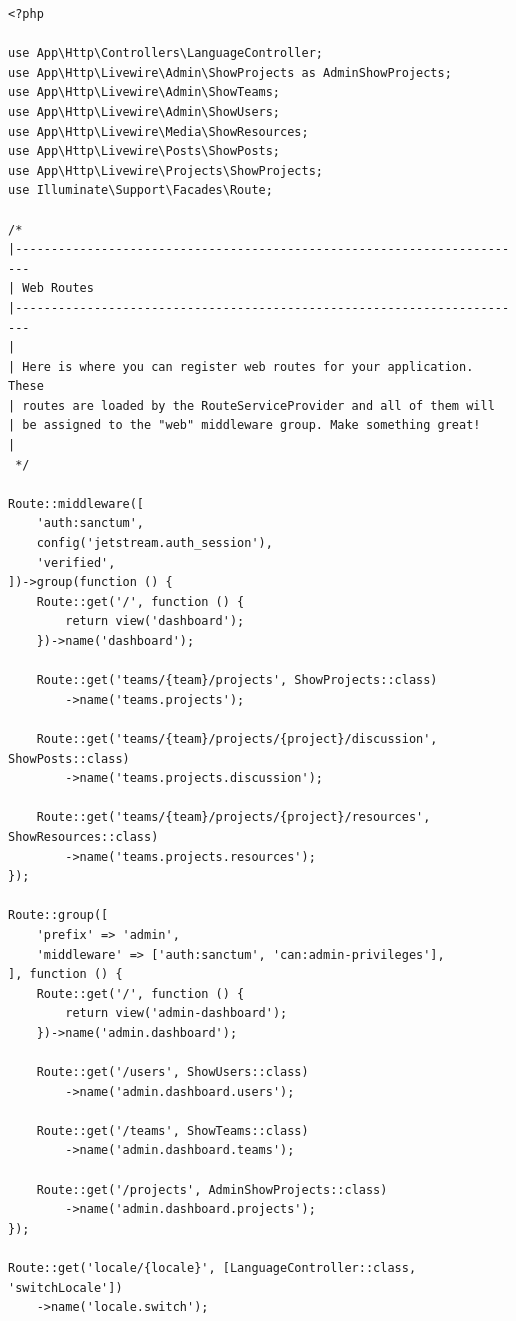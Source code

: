 \begin{lstlisting}[caption={Sadržaj datoteke \texttt{routes/web.php}}, label=routes]
<?php

use App\Http\Controllers\LanguageController;
use App\Http\Livewire\Admin\ShowProjects as AdminShowProjects;
use App\Http\Livewire\Admin\ShowTeams;
use App\Http\Livewire\Admin\ShowUsers;
use App\Http\Livewire\Media\ShowResources;
use App\Http\Livewire\Posts\ShowPosts;
use App\Http\Livewire\Projects\ShowProjects;
use Illuminate\Support\Facades\Route;

/*
|------------------------------------------------------------------------
| Web Routes
|------------------------------------------------------------------------
|
| Here is where you can register web routes for your application. These
| routes are loaded by the RouteServiceProvider and all of them will
| be assigned to the "web" middleware group. Make something great!
|
 */

Route::middleware([
    'auth:sanctum',
    config('jetstream.auth_session'),
    'verified',
])->group(function () {
    Route::get('/', function () {
        return view('dashboard');
    })->name('dashboard');

    Route::get('teams/{team}/projects', ShowProjects::class)
        ->name('teams.projects');

    Route::get('teams/{team}/projects/{project}/discussion', ShowPosts::class)
        ->name('teams.projects.discussion');

    Route::get('teams/{team}/projects/{project}/resources', ShowResources::class)
        ->name('teams.projects.resources');
});

Route::group([
    'prefix' => 'admin',
    'middleware' => ['auth:sanctum', 'can:admin-privileges'],
], function () {
    Route::get('/', function () {
        return view('admin-dashboard');
    })->name('admin.dashboard');

    Route::get('/users', ShowUsers::class)
        ->name('admin.dashboard.users');

    Route::get('/teams', ShowTeams::class)
        ->name('admin.dashboard.teams');

    Route::get('/projects', AdminShowProjects::class)
        ->name('admin.dashboard.projects');
});

Route::get('locale/{locale}', [LanguageController::class, 'switchLocale'])
    ->name('locale.switch');

\end{lstlisting}


